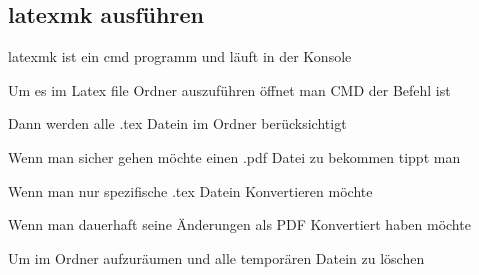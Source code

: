 \documentclass[letterpaper,10pt,ngerman]{sphinxmanual}
\begin{document}
\begin{sphinxVerbatim}[commandchars=\\\{\}]
\end{sphinxVerbatim}


\subsection{latexmk ausführen}
\label{\detokenize{latexpdf/latextopdf:latexmk-ausfuhren}}
\sphinxAtStartPar
latexmk ist ein cmd programm und läuft in der Konsole

\sphinxAtStartPar
Um es im Latex file Ordner auszuführen öffnet man CMD der Befehl ist

\begin{sphinxVerbatim}[commandchars=\\\{\}]
\end{sphinxVerbatim}

\sphinxAtStartPar
Dann werden alle .tex Datein im Ordner berücksichtigt

\sphinxAtStartPar
Wenn man sicher gehen möchte einen .pdf Datei zu bekommen tippt man

\begin{sphinxVerbatim}[commandchars=\\\{\}]
 
\end{sphinxVerbatim}

\sphinxAtStartPar
Wenn man nur spezifische .tex Datein Konvertieren möchte

\begin{sphinxVerbatim}[commandchars=\\\{\}]
 
\end{sphinxVerbatim}

\sphinxAtStartPar
Wenn man dauerhaft seine Änderungen als PDF Konvertiert haben möchte

\begin{sphinxVerbatim}[commandchars=\\\{\}]
 
\end{sphinxVerbatim}

\sphinxAtStartPar
Um im Ordner aufzuräumen und alle temporären Datein zu löschen

\begin{sphinxVerbatim}[commandchars=\\\{\}]
 
\end{sphinxVerbatim}
\end{document}

